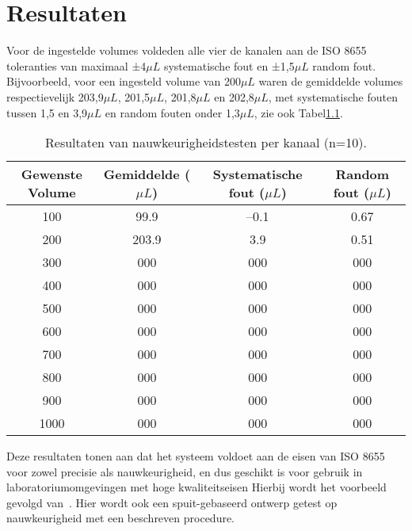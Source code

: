 \chapter{Resultaten}
Voor de ingestelde volumes voldeden alle vier de kanalen aan de ISO 8655 toleranties van maximaal ±4$\mu L$ systematische fout en ±1{,}5$\mu L$ random fout. Bijvoorbeeld, voor een ingesteld volume van 200$\mu L$ waren de gemiddelde volumes respectievelijk 203{,}9$\mu L$, 201{,}5$\mu L$, 201{,}8$\mu L$ en 202{,}8$\mu L$, met systematische fouten tussen 1{,}5 en 3{,}9$\mu L$ en random fouten onder 1{,}3$\mu L$, zie ook Tabel\ref{tab:accuracies}.

\begin{table}[H] \centering \begin{tabular}{c|c|c|c} 
    \textbf{Gewenste Volume} & \textbf{Gemiddelde ($\mu L$)} & \textbf{Systematische fout ($\mu L$)} & \textbf{Random fout ($\mu L$)}\\
    \hline
    100 & 99.9 & –0.1 & 0.67 \\
    200 & 203.9 & 3.9 & 0.51 \\ 
    300 & 000 & 000 & 000 \\
    400 & 000 & 000 & 000 \\
    500 & 000 & 000 & 000 \\
    600 & 000 & 000 & 000 \\
    700 & 000 & 000 & 000 \\
    800 & 000 & 000 & 000 \\
    900 & 000 & 000 & 000 \\
    1000 & 000 & 000 & 000 \\   

\end{tabular} \caption{Resultaten van nauwkeurigheidstesten per kanaal (n=10).}\label{tab:accuracies} \end{table}

Deze resultaten tonen aan dat het systeem voldoet aan de eisen van ISO 8655 voor zowel precisie als nauwkeurigheid, en dus geschikt is voor gebruik in laboratoriumomgevingen met hoge kwaliteitseisen
Hierbij wordt het voorbeeld gevolgd van\ \cite{RN49}. Hier wordt ook een spuit-gebaseerd ontwerp getest op nauwkeurigheid met een beschreven procedure.